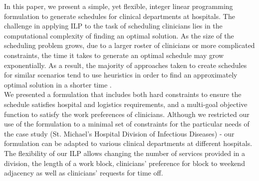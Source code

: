 In this paper, we present a simple, yet flexible, integer linear programming
formulation to generate schedules for clinical departments at hospitals.
The challenge in applying ILP to the task of scheduling clinicians lies in the
computational complexity of finding an optimal solution. As the size of the
scheduling problem grows, due to a larger roster of clinicians or more
complicated constraints, the time it takes to generate an optimal schedule may
grow exponentially.
As a result, the majority of approaches taken to create schedules for similar
scenarios tend to use heuristics in order to find an approximately optimal
solution in a shorter time \cite{burke_state_2004}. \\  %


We presented a formulation that includes both hard constraints to ensure the
schedule satisfies hospital and logistics requirements, and a multi-goal
objective function to satisfy the work preferences of clinicians.
Although we restricted our use of the formulation to a minimal set of
constraints for the particular needs of the case study (St. Michael's Hospital
Division of Infectious Diseases) - our formulation can be adapted to various
clinical departments at different hospitals. The flexibility of our ILP allows
changing the number of services provided in a division, the length of a work
block, clinicians' preference for block to weekend adjacency as well as
clinicians' requests for time off. \\

